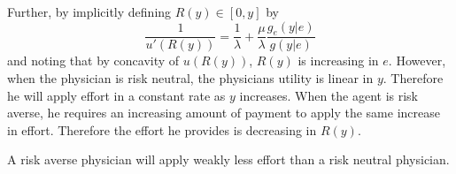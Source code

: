 Further, by implicitly defining $R(y)\in[0,y]$ by 
\[
    \frac{1}{u'(R(y))}=\frac{1}{\lambda}+\frac{\mu}{\lambda}\frac{g_e(y|e)}{g(y|e)}
\]
and noting that by concavity of $u(R(y))$, $R(y)$ is increasing in $e$. However, when the physician is risk neutral, the physicians utility is linear in $y$. Therefore he will apply effort in a constant rate as $y$ increases. When the agent is risk averse, he requires an increasing amount of payment to apply the same increase in effort. Therefore the effort he provides is decreasing in $R(y)$. 


\begin{proposition}
A risk averse physician will apply weakly less effort than a risk neutral physician. 
\end{proposition}
\printbibliography%
\listoftodos
